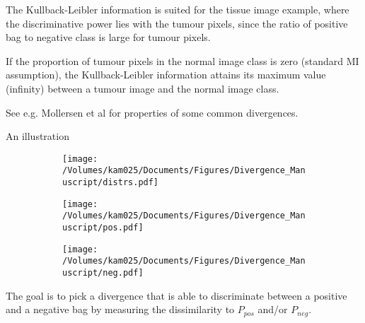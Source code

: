 The Kullback-Leibler information is suited for the tissue image example, where the discriminative power lies with the tumour pixels, since the ratio of positive bag to negative class is large for tumour pixels. 

If the proportion of tumour pixels in the normal image class is zero (standard MI assumption), the Kullback-Leibler information attains its maximum value (infinity) between a tumour image and the normal image class. 



See e.g. {\color{green} Mollersen et al} for properties of some common divergences. 

An illustration
\begin{figure}[!h]
  \centering
  \begin{subfigure}{}
    \texttt{[image: /Volumes/kam025/Documents/Figures/Divergence\_Manuscript/distrs.pdf]}
  \end{subfigure}    
  \begin{subfigure}{}
    \texttt{[image: /Volumes/kam025/Documents/Figures/Divergence\_Manuscript/pos.pdf]}
  \end{subfigure}
  \begin{subfigure}{}
    \texttt{[image: /Volumes/kam025/Documents/Figures/Divergence\_Manuscript/neg.pdf]}
  \end{subfigure}
\end{figure}

The goal is to pick a divergence that is able to discriminate between a positive and a negative bag by measuring the dissimilarity to $P_{pos}$ and/or $P_{neg}$.

